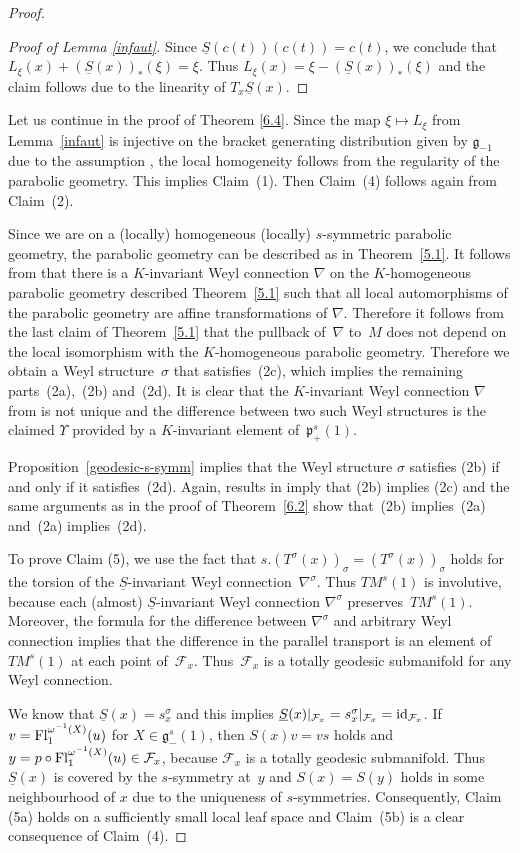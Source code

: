 \documentclass[10pt,a4paper]{amsart}
\newcommand{\om}{\omega}
\newcommand{\si}{\sigma}
\newcommand{\un}{\underline}
\newcommand{\fg}{\mathfrak g}
\newcommand{\fp}{\mathfrak p}
\newcommand{\Fl}{{\rm Fl}}
\newcommand{\id}{{\rm id}}
\newcommand{\na}{\nabla}
\newcommand{\U}{\Upsilon}
\numberwithin{equation}{section}
\begin{document}
\begin{proof}
\begin{proof}[Proof of Lemma \ref{infaut}]
Since $\un S(c(t))(c(t))=c(t)$, we conclude that $L_\xi(x)+(\un S(x))_*(\xi)=\xi$. Thus $L_\xi(x)=\xi-(\un S(x))_*(\xi)$ and the claim follows due to the linearity of $T_x\un S(x)$.
\end{proof}

Let us continue in the proof of Theorem \ref{6.4}. Since the map $\xi \mapsto L_\xi$ from Lemma~\ref{infaut} is injective on the bracket generating distribution given by $\fg_{-1}$ due to the assumption \smash{$\fg_{-1}^s(1)=0$}, the local homogeneity follows from the regularity of the parabolic geometry. This implies Claim~(1). Then Claim~(4) follows again from Claim~(2).

Since we are on a (locally) homogeneous (locally) $s$-symmetric parabolic geometry, the parabolic geometry can be described as in Theorem~\ref{5.1}. It follows from \cite[Theorem~1.3]{GZ3} that there is a $K$-invariant Weyl connection $\nabla$ on the $K$-homogeneous parabolic geometry described Theorem~\ref{5.1} such that all local automorphisms of the parabolic geometry are af\/f\/ine transformations of $\nabla$. Therefore it follows from the last claim of Theorem~\ref{5.1} that the pullback of~$\nabla$ to~$M$ does not depend on the local isomorphism with the $K$-homogeneous parabolic geo\-met\-ry. Therefore we obtain a Weyl structure~$\si$ that satisf\/ies~(2c), which implies the remaining parts~(2a),~(2b) and~(2d). It is clear that the $K$-invariant Weyl connection $\nabla$ from \cite[Theorem~1.3]{GZ3} is not unique and the dif\/ference between two such Weyl structures is the claimed $\U$ provided by a $K$-invariant element of~$\fp_+^s(1)$.

Proposition~\ref{geodesic-s-symm} implies that the Weyl structure $\si$ satisf\/ies (2b) if and only if it satisf\/ies~(2d). Again, results in \cite[Theorem~1.3]{GZ3} imply that (2b) implies (2c) and the same arguments as in the proof of Theorem~\ref{6.2} show that~(2b) implies~(2a) and~(2a) implies~(2d).

To prove Claim (5), we use the fact that $s.(T^\si(x))_\si=(T^\si(x))_\si$ holds for the torsion of the $\un S$-invariant Weyl connection~$\na^\si$. Thus $TM^s(1)$ is involutive, because each (almost) $\un S$-invariant Weyl connection $\nabla^\si$ preserves~$TM^s(1)$. Moreover, the formula for the dif\/ference between $\nabla^\si$ and arbitrary Weyl connection implies that the dif\/ference in the parallel transport is an element of~$TM^s(1)$ at each point of~$\mathcal{F}_x$. Thus~$\mathcal{F}_x$ is a totally geodesic submanifold for any Weyl connection.

We know that $\un S(x)=s^{\si}_x$ and this implies $\un S(x)|_{\mathcal{F}_x}=s^{\si}_x|_{\mathcal{F}_x}=\id_{\mathcal{F}_x}$. If $v=\Fl_1^{\om^{-1}(X)}(u)$ for $X\in \fg_{-}^s(1)$, then $S(x)v=vs$ holds and $y=p\circ \Fl_1^{\om^{-1}(X)}(u)\in \mathcal{F}_x$, because $\mathcal{F}_x$ is a totally geodesic submanifold. Thus $\un S(x)$ is covered by the $s$-symmetry at~$y$ and $S(x)=S(y)$ holds in some neighbourhood of $x$ due to the uniqueness of $s$-symmetries. Consequently, Claim (5a) holds on a suf\/f\/iciently small local leaf space and Claim~(5b) is a clear consequence of Claim~(4).
\end{proof}
\end{document}
